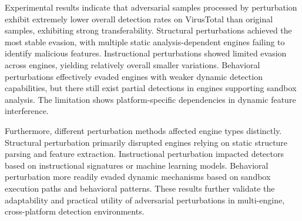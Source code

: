Experimental results indicate that adversarial samples processed by perturbation exhibit extremely lower overall detection rates on VirusTotal than original samples, exhibiting strong transferability. Structural perturbations achieved the most stable evasion, with multiple static analysis-dependent engines failing to identify malicious features. Instructional perturbations showed limited evasion across engines, yielding relatively overall smaller variations. Behavioral perturbations effectively evaded engines with weaker dynamic detection capabilities, but there still exist partial detections in engines supporting sandbox analysis. The limitation shows platform-specific dependencies in dynamic feature interference.

Furthermore, different perturbation methods affected engine types distinctly. Structural perturbation primarily disrupted engines relying on static structure parsing and feature extraction. Instructional perturbation impacted detectors based on instructional signatures or machine learning models. Behavioral perturbation more readily evaded dynamic mechanisms based on sandbox execution paths and behavioral patterns. These results further validate the adaptability and practical utility of adversarial perturbations in multi-engine, cross-platform detection environments.


